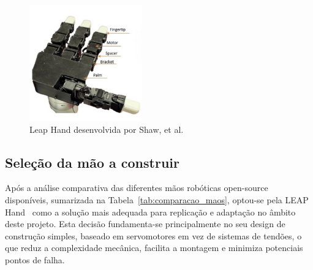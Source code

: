 \begin{figure}[H]
    \centering
    \includegraphics[height=5cm,keepaspectratio]{figs/chapter2/leap_hand.png}
    \caption{Leap Hand desenvolvida por Shaw, et al.\cite{shaw2023leaphand}}
    \label{fig:leap_hand}
    
\end{figure}


\subsection{Seleção da mão a construir}

Após a análise comparativa das diferentes mãos robóticas open-source disponíveis, sumarizada na Tabela~\ref{tab:comparacao_maos}, optou-se pela LEAP Hand~\cite{shaw2023leaphand} como a solução mais adequada para replicação e adaptação no âmbito deste projeto. Esta decisão fundamenta-se principalmente no seu design de construção simples, baseado em servomotores em vez de sistemas de tendões, o que reduz a complexidade mecânica, facilita a montagem e minimiza potenciais pontos de falha.

\begin{table}[H]
    \centering
    \caption{Comparação entre diferentes mãos robóticas open-source}
    \label{tab:comparacao_maos}
\end{table}

